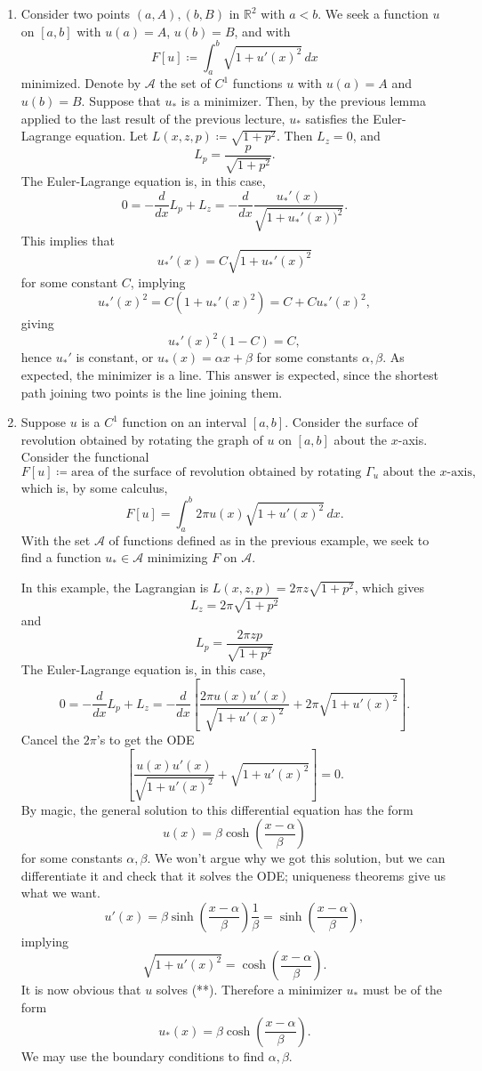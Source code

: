 \documentclass[11pt]{article}
\newcommand{\R}{\mathbb{R}}
\begin{document}
\begin{enumerate}
\item
Consider two points $(a,A), (b,B)$ in $\R^2$ with $a < b$. We seek a function $u$ on $[a,b]$ with $u(a) = A$, $u(b) = B$, and with
\[
F[u] \coloneqq \int_a^b \sqrt{1 + u'(x)^2} \, dx
\]
minimized. Denote by $\mathcal{A}$ the set of $C^1$ functions $u$ with $u(a) = A$ and $u(b) = B$. Suppose that $u_*$ is a minimizer. Then, by the previous lemma applied to the last result of the previous lecture, $u_*$ satisfies the Euler-Lagrange equation. Let $L(x,z,p) \coloneqq \sqrt{1 + p^2}$. Then $L_z = 0$, and
\[
L_p = \frac{p}{\sqrt{1 + p^2}}.
\]
The Euler-Lagrange equation is, in this case,
\[
\tag{*}
0 = -\frac{d}{dx} L_p + L_z = -\frac{d}{dx} \frac{u_*'(x)}{\sqrt{1 + u_*'(x))^2}}.
\]
This implies that 
\[
u_*'(x) = C\sqrt{1 + u_*'(x)^2}
\]
for some constant $C$, implying
\[
u_*'(x)^2 = C(1 + u_*'(x)^2) = C + C u_*'(x)^2,
\]
giving
\[
u_*'(x)^2(1 - C) = C,
\]
hence $u_*'$ is constant, or $u_*(x) = \alpha x + \beta$ for some constants $\alpha, \beta$. As expected, the minimizer is a line. This answer is expected, since the shortest path joining two points is the line joining them.

\item
Suppose $u$ is a $C^1$ function on an interval $[a,b]$. Consider the surface of revolution obtained by rotating the graph of $u$ on $[a,b]$ about the $x$-axis. Consider the functional
\[
F[u] \coloneqq \text{area of the surface of revolution obtained by rotating $\Gamma_u$ about the $x$-axis},
\]
which is, by some calculus,
\[
F[u] = \int_a^b 2\pi u(x) \sqrt{1 + u'(x)^2} \, dx.
\]
With the set $\mathcal{A}$ of functions defined as in the previous example, we seek to find a function $u_* \in \mathcal{A}$ minimizing $F$ on $\mathcal{A}$.

In this example, the Lagrangian is $L(x,z,p) = 2\pi z \sqrt{1 + p^2}$, which gives
\[
L_z = 2\pi \sqrt{1 + p^2}
\]
and
\[
L_p = \frac{2\pi z p}{\sqrt{1 + p^2}}
\]
The Euler-Lagrange equation is, in this case,
\[
0 = -\frac{d}{dx} L_p + L_z = -\frac{d}{dx} \left[ \frac{2\pi u(x)u'(x)}{\sqrt{1 + u'(x)^2}} + 2\pi \sqrt{1 + u'(x)^2} \right].
\]
Cancel the $2\pi$'s to get the ODE
\[
\tag{**}
\left[ \frac{u(x)u'(x)}{\sqrt{1 + u'(x)^2}} + \sqrt{1 + u'(x)^2} \right] = 0.
\]
By magic, the general solution to this differential equation has the form
\[
u(x) = \beta \cosh\left(\frac{x - \alpha}{\beta} \right)
\]
for some constants $\alpha, \beta$. We won't argue why we got this solution, but we can differentiate it and check that it solves the ODE; uniqueness theorems give us what we want.
\[
u'(x) = \beta \sinh \left( \frac{x - \alpha}{\beta} \right) \frac{1}{\beta} = \sinh \left( \frac{x - \alpha}{\beta} \right),
\]
implying
\[
\sqrt{1 + u'(x)^2} = \cosh \left( \frac{x - \alpha}{\beta} \right).
\]
It is now obvious that $u$ solves (**). Therefore a minimizer $u_*$ must be of the form
\[
u_*(x) = \beta \cosh \left( \frac{x - \alpha}{\beta} \right).
\]
We may use the boundary conditions to find $\alpha, \beta$.


\end{enumerate}
\end{document}
